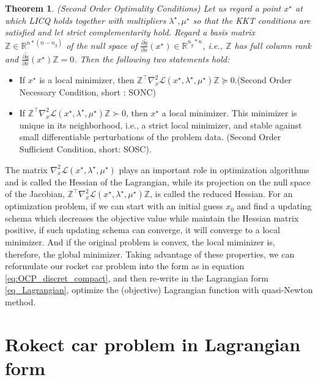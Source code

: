 \documentclass  [
  paper    = a4,
  BCOR     = 10mm,
  twoside,
  fontsize = 12pt,
  fleqn,
  toc      = bibnumbered,
  toc      = listofnumbered,
  numbers  = noendperiod,
  headings = normal,
  listof   = leveldown,
  version  = 3.03
]                                       {scrreprt}
\newcommand{\<}{\langle}
\renewcommand{\>}{\rangle}
\newtheorem{theorem}{Theorem}
\begin{document}
\begin{theorem}(Second Order Optimality Conditions) Let us regard a point $x^\star$ at which LICQ holds together with
multipliers $\lambda^\star, \mu^\star$ so that the KKT conditions are satisfied and let strict complementarity hold. Regard a basis matrix $\mathbb{Z} \in  \mathbb{R}^{n*(n-n_g)}$ of the null space of $\frac{\partial \tilde{g}}{\partial x} (x^\star) \in \mathbb{R}^{n_{\tilde{g}} *n}$, i.e., $\mathbb{Z}$ has full column rank and $\frac{\partial \tilde{g}}{\partial x} (x^\star)\mathbb{Z} =0$. Then the following two statements hold:
\end{theorem}
\begin{itemize}
\item  If $x^\star$ is a local minimizer, then $\mathbb{Z}^\top \nabla_x^2 \mathcal{L}(x^\star, \lambda^\star, \mu^\star)\mathbb{Z} \succeq 0  $.(Second Order Necessary Condition, short : SONC)
\item  If $\mathbb{Z}^\top \nabla_x^2 \mathcal{L}(x^\star, \lambda^\star, \mu^\star)\mathbb{Z} \succ 0 $, then $x^\star$ a local minimizer. This minimizer is unique in its neighborhood, i.e., a strict local minimizer, and stable against small differentiable perturbations of the problem data. (Second Order Sufficient Condition, short: SOSC).
\end{itemize}


The matrix $\nabla_x^2 \mathcal{L}(x^\star, \lambda^\star, \mu^\star)$ plays an important role in optimization algorithms and is called the Hessian of the Lagrangian, while its projection on the null space of the Jacobian, $\mathbb{Z}^\top \nabla_x^2 \mathcal{L}(x^\star, \lambda^\star, \mu^\star)\mathbb{Z}$, is called the reduced
Hessian. For an optimization problem, if we can start with an initial guess $x_0$ and find a updating schema which decreases the objective value while maintain the Hessian matrix positive, if such updating schema can converge, it will converge to a local minimizer. And if the original problem is convex, the local miminizer is, therefore, the global minimizer. Taking advantage of these properties, we can reformulate our rocket car problem into the form as in equation \ref{eq:OCP_discret_compact}, and then re-write in the Lagrangian form \ref{eq_Lagrangian}, optimize the (objective) Lagrangian function with quasi-Newton method. 

\section{Rokect car problem in Lagrangian form}
\end{document}
